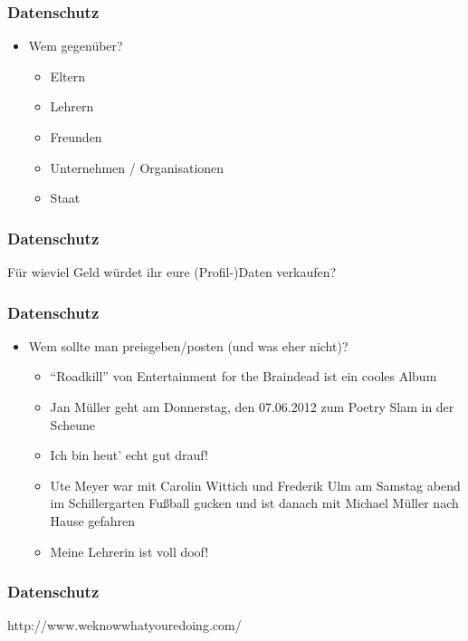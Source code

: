 \documentclass[12pt]{beamer}
\begin{document}
\begin{frame}
  \frametitle{Datenschutz}

  \begin{itemize}
    \item Wem gegenüber?
      \begin{itemize}
        \item<2-> Eltern
        \item<3-> Lehrern
        \item<4-> Freunden
        \item<5-> Unternehmen / Organisationen
        \item<6-> Staat
      \end{itemize}
  \end{itemize}
\end{frame}

\begin{frame}
  \frametitle{Datenschutz}

  \begin{center} \Large
   Für wieviel Geld würdet ihr eure (Profil-)Daten verkaufen?
  \end{center}
\end{frame}

\begin{frame}
  \frametitle{Datenschutz}

  \begin{itemize}
    \item Wem sollte man preisgeben/posten (und was eher nicht)?
      \begin{itemize}
        \item<2-> "`Roadkill"' von Entertainment for the Braindead ist ein cooles Album
        \item<3-> Jan Müller geht am Donnerstag, den 07.06.2012 zum Poetry Slam in der Scheune
        \item<4-> Ich bin heut' echt gut drauf!
        \item<5-> Ute Meyer war mit Carolin Wittich und Frederik Ulm am Samstag abend im Schillergarten Fußball gucken und ist danach mit Michael Müller nach Hause gefahren
        \item<6-> Meine Lehrerin ist voll doof!
      \end{itemize}
  \end{itemize}
\end{frame}

\begin{frame}
  \frametitle{Datenschutz}

  \begin{center} \Large
   http://www.weknowwhatyouredoing.com/
  \end{center}
\end{frame}
\end{document}
